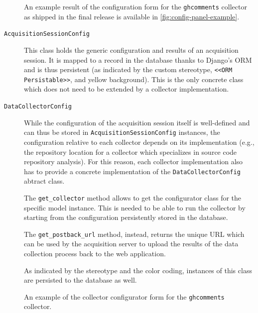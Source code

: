 \begin{description}
    An example result of the configuration form for the \texttt{ghcomments} collector as shipped in the final release is available in \vref{fig:config-panel-example}.

  \item[\texttt{AcquisitionSessionConfig}] This class holds the generic configuration and results of an acquisition session. It is mapped to a record in the database thanks to Django's ORM and is thus persistent (as indicated by the custom stereotype, \texttt{<<ORM Persistable>>}, and yellow background). This is the only concrete class which does not need to be extended by a collector implementation.

  \item[\texttt{DataCollectorConfig}] While the configuration of the acquisition session itself is well-defined and can thus be stored in \texttt{AcquisitionSessionConfig} instances, the configuration relative to each collector depends on its implementation (e.g., the repository location for a collector which specializes in source code repository analysis). For this reason, each collector implementation also has to provide a concrete implementation of the \texttt{DataCollectorConfig} abtract class.

    The \texttt{get\_collector} method allows to get the configurator class for the specific model instance. This is needed to be able to run the collector by starting from the configuration persistently stored in the database.

    The \texttt{get\_postback\_url} method, instead, returns the unique URL which can be used by the acquisition server to upload the results of the data collection process back to the web application.

    As indicated by the stereotype and the color coding, instances of this class are persisted to the database as well.
\end{description}

\begin{figure}
	\hfill
  \caption{An example of the collector configurator form for the \texttt{ghcomments} collector.}
  \label{fig:config-panel-example}
\end{figure}

